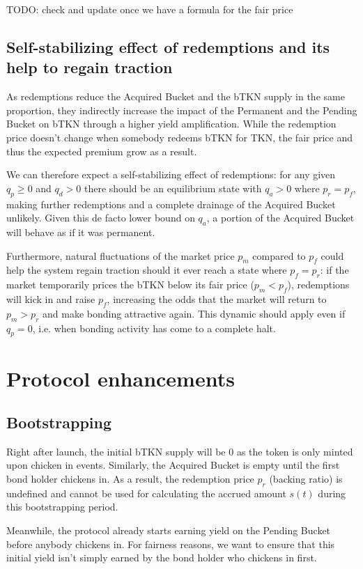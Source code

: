 \documentclass{article}
\begin{document}
TODO: check and update once we have a formula for the fair price

\subsection{Self-stabilizing effect of redemptions and its help to regain traction}
  \label{sec:self-stabilizing}
As redemptions reduce the Acquired Bucket and the bTKN supply in the same proportion, they indirectly increase the impact of the Permanent and the Pending Bucket on bTKN through a higher yield amplification. While the redemption price doesn't change when somebody redeems bTKN for TKN, the fair price and thus the expected premium grow as a result. 

We can therefore expect a self-stabilizing effect of redemptions: for any given $q_p \geq 0$ and $q_d > 0$ there should be an equilibrium state with $q_a > 0$ where $p_r = p_f$, making further redemptions and a complete drainage of the Acquired Bucket unlikely. Given this de facto lower bound on $q_a$, a portion of the Acquired Bucket will behave as if it was permanent.

Furthermore, natural fluctuations of the market price $p_m$ compared to $p_f$ could help the system regain traction should it ever reach a state where $p_f = p_r$: if the market temporarily prices the bTKN below its fair price ($p_m < p_f$), redemptions will kick in and raise $p_f$, increasing the odds that the market will return to $p_m > p_r$ and make bonding attractive again. This dynamic should apply even if $q_p = 0$, i.e. when bonding activity has come to a complete halt.

\section{Protocol enhancements}
\subsection{Bootstrapping}
  \label{sec:bootstrapping}
Right after launch, the initial bTKN supply will be 0 as the token is only minted upon chicken in events. Similarly, the Acquired Bucket is empty until the first bond holder chickens in. As a result, the redemption price $p_r$ (backing ratio) is undefined and cannot be used for calculating the accrued amount $s(t)$ during this bootstrapping period.

Meanwhile, the protocol already starts earning yield on the Pending Bucket before anybody chickens in. For fairness reasons, we want to ensure that this initial yield isn't simply earned by the bond holder who chickens in first.
\end{document}
